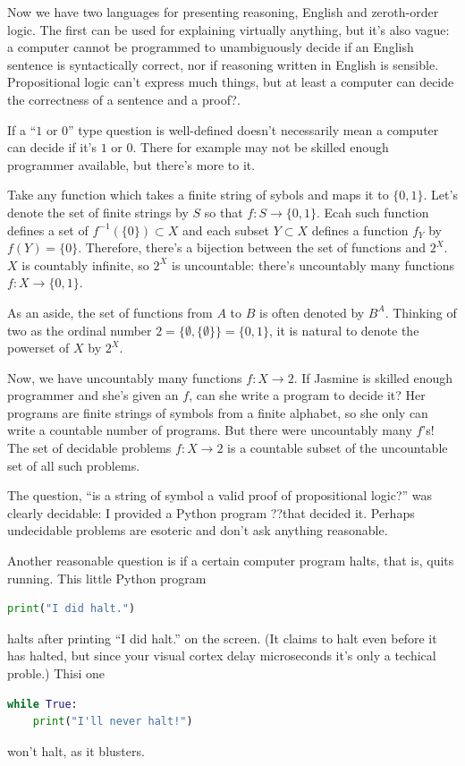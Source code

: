\documentclass[11pt,oneside,%
]{memoir}
\theoremstyle{definition}
\begin{document}
Now we have two languages for presenting reasoning, English and zeroth-order logic. The first can be used for explaining virtually anything, but it's also vague: a computer cannot be programmed to unambiguously decide if an English sentence is syntactically correct, nor if reasoning written in English is sensible. Propositional logic can't express much things, but at least a computer can decide the correctness of a sentence and a proof?.

If a ``\(1\) or \(0\)'' type question is well-defined doesn't necessarily mean a computer can decide if it's \(1\) or \(0\). There for example may not be skilled enough programmer available, but there's more to it.

Take any function which takes a finite string of sybols and maps it to \(\lbrace0,1\rbrace\). Let's denote the set of finite strings by \(S\) so that \(f:S\rightarrow\lbrace0,1\rbrace\). Ecah such function defines a set of \(f^{-1}(\lbrace0\rbrace)\subset X\) and each subset \(Y\subset X\) defines a function \(f_Y\) by \(f(Y)=\lbrace0\rbrace\). Therefore, there's a bijection between the set of functions and \(2^X\). \(X\) is countably infinite, so \(2^X\) is uncountable: there's uncountably many functions \(f:X\rightarrow\lbrace0,1\rbrace\).

As an aside, the set of functions from \(A\) to \(B\) is often denoted by \(B^A\). Thinking of two as the ordinal number \(2=\lbrace\emptyset,\lbrace\emptyset\rbrace\rbrace=\lbrace0,1\rbrace\), it is natural to denote the powerset of \(X\) by \(2^X\).

Now, we have uncountably many functions \(f:X\rightarrow 2\). If Jasmine is skilled enough programmer and she's given an \(f\), can she write a program to decide it? Her programs are finite strings of symbols from a finite alphabet, so she only can write a countable number of programs. But there were uncountably many \(f\)'s! The set of decidable problems \(f:X\rightarrow2\) is a countable subset of the uncountable set of all such problems.

The question, ``is a string of symbol a valid proof of propositional logic?'' was clearly decidable: I provided a Python program ??that decided it. Perhaps undecidable problems are esoteric and don't ask anything reasonable.

Another reasonable question is if a certain computer program halts, that is, quits running. This little Python program
\begin{lstlisting}[language=python]
print("I did halt.")
\end{lstlisting}
halts after printing ``I did halt.'' on the screen. (It claims to halt even before it has halted, but since your visual cortex delay microseconds it's only a techical proble.) Thisi one
\begin{lstlisting}[language=python]
while True:
    print("I'll never halt!")
\end{lstlisting}
won't halt, as it blusters.
\end{document}
